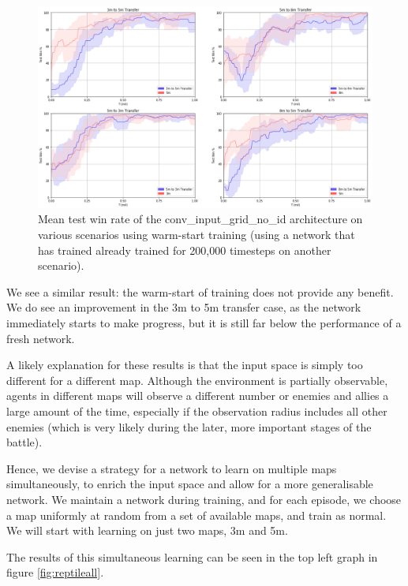 \begin{figure}[h]
    \centering
    \hbox{\hspace{-5em}\includegraphics[width=1.2\textwidth]{images/graphs/2.png}}
    \caption{Mean test win rate of the conv\_input\_grid\_no\_id architecture on various scenarios using warm-start training (using a network that has trained already trained for 200,000 timesteps on another scenario).}
    \label{fig:transfer2}
\end{figure}

We see a similar result: the warm-start of training does not provide any benefit. We do see an improvement in the 3m to 5m transfer case, as the network immediately starts to make progress, but it is still far below the performance of a fresh network.

A likely explanation for these results is that the input space is simply too different for a different map. Although the environment is partially observable, agents in different maps will observe a different number or enemies and allies a large amount of the time, especially if the observation radius includes all other enemies (which is very likely during the later, more important stages of the battle). 

Hence, we devise a strategy for a network to learn on multiple maps simultaneously, to enrich the input space and allow for a more generalisable network. We maintain a network during training, and for each episode, we choose a map uniformly at random from a set of available maps, and train as normal. We will start with learning on just two maps, 3m and 5m.

The results of this simultaneous learning can be seen in the top left graph in figure \ref{fig:reptileall}. 




